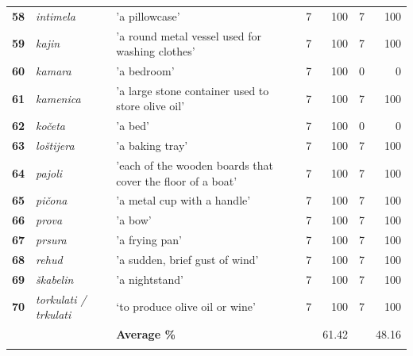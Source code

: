 \documentclass[output=paper]{LSP/langsci}
\begin{document}
\begin{table}
{\begin{tabular}{lp{}p{}lrlr}
{\bfseries 58} & {\itshape intimela} & 'a pillowcase' & 7 & 100 & 7 & 100\\

{\bfseries 59} & {\itshape kajin} & 'a round metal vessel used for washing clothes' & 7 & 100 & 7 & 100\\

{\bfseries 60} & {\itshape kamara} & 'a bedroom' & 7 & 100 & 0 & 0\\

{\bfseries 61} & {\itshape kamenica} & 'a large stone container used to store olive oil' & 7 & 100 & 7 & 100\\

{\bfseries 62} & {\itshape kočeta} & 'a bed' & 7 & 100 & 0 & 0\\

{\bfseries 63} & {\itshape loštijera} & 'a baking tray' & 7 & 100 & 7 & 100\\

{\bfseries 64} & {\itshape pajoli} & 'each of the wooden boards that cover the floor of a boat' & 7 & 100 & 7 & 100\\

{\bfseries 65} & {\itshape pičona} & 'a metal cup with a handle' & 7 & 100 & 7 & 100\\

{\bfseries 66} & {\itshape prova} & 'a bow' & 7 & 100 & 7 & 100\\

{\bfseries 67} & {\itshape prsura} & 'a frying pan' & 7 & 100 & 7 & 100\\

{\bfseries 68} & {\itshape rehud} & 'a sudden, brief gust of wind' & 7 & 100 & 7 & 100\\

{\bfseries 69} & {\itshape škabelin} & 'a nightstand' & 7 & 100 & 7 & 100\\

{\bfseries 70} & {\itshape torkulati / trkulati} & ‘to produce olive oil or wine’ & 7 & 100 & 7 & 100\\

\midrule
& & \bfseries Average \% & & 61.42 & & 48.16\\

\lspbottomrule
\end{tabular}
}
\end{table}
\end{document}
